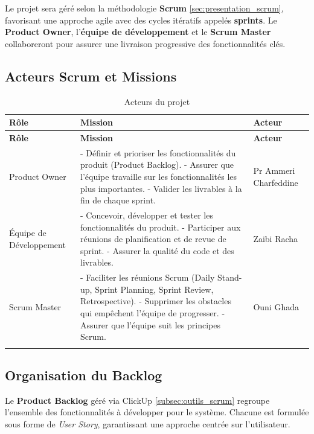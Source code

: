 Le projet sera géré selon la méthodologie \textbf{Scrum}  \ref{sec:presentation_scrum}, favorisant une approche agile avec des cycles itératifs appelés \textbf{sprints}. Le \textbf{Product Owner}, l’\textbf{équipe de développement} et le \textbf{Scrum Master} collaboreront pour assurer une livraison progressive des fonctionnalités clés.

\subsection*{Acteurs Scrum et Missions}
\begin{longtable}{|m{3cm}|m{8cm}|m{2cm}|}
\hline
\textbf{Rôle} & \textbf{Mission} & \textbf{Acteur} \\
\hline
\endfirsthead
\hline
\textbf{Rôle} & \textbf{Mission} & \textbf{Acteur} \\
\hline
\endhead
\endfoot
Product Owner & 
- Définir et prioriser les fonctionnalités du produit (Product Backlog). \newline
- Assurer que l'équipe travaille sur les fonctionnalités les plus importantes. \newline
- Valider les livrables à la fin de chaque sprint. &
Pr Ammeri Charfeddine \\
\hline
Équipe de Développement & 
- Concevoir, développer et tester les fonctionnalités du produit. \newline
- Participer aux réunions de planification et de revue de sprint. \newline
- Assurer la qualité du code et des livrables. &
Zaibi Racha \\
\hline
Scrum Master & 
- Faciliter les réunions Scrum (Daily Stand-up, Sprint Planning, Sprint Review, Retrospective). \newline
- Supprimer les obstacles qui empêchent l'équipe de progresser. \newline
- Assurer que l'équipe suit les principes Scrum. &
Ouni Ghada\\
\hline
\caption{Acteurs du projet} 
\end{longtable}

\subsection*{Organisation du Backlog}
Le \textbf{Product Backlog} géré via ClickUp \ref{subsec:outils_scrum} regroupe l’ensemble des fonctionnalités à développer pour le système. Chacune est formulée sous forme de \textit{User Story}, garantissant une approche centrée sur l’utilisateur.

